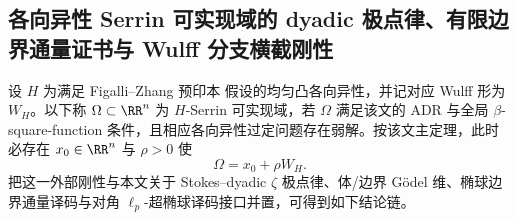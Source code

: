 \subsection{各向异性 Serrin 可实现域的 dyadic 极点律、有限边界通量证书与 Wulff 分支横截刚性}\label{subsec:conclusion-anisotropic-serrin-wulff-dyadic-flux-certificates}
设 \(H\) 为满足 Figalli--Zhang 预印本 \cite{FigalliZhang2026AnisotropicSerrinGeneralDomains} 假设的均匀凸各向异性，并记对应 Wulff 形为 \(W_H\)。以下称 \(\Omega\subset\RR^n\) 为 \(H\)-Serrin 可实现域，若 \(\Omega\) 满足该文的 ADR 与全局 \(\beta\)-square-function 条件，且相应各向异性过定问题存在弱解。按该文主定理，此时必存在 \(x_0\in\RR^n\) 与 \(\rho>0\) 使
\[
\Omega=x_0+\rho W_H.
\]
把这一外部刚性与本文关于 Stokes--dyadic \(\zeta\) 极点律、体/边界 Gödel 维、椭球边界通量译码与对角 \(\ell_p\)-超椭球译码接口并置，可得到如下结论链。

